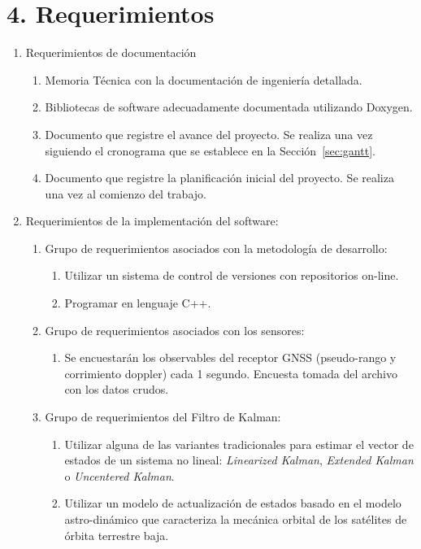 \documentclass[11pt]{charter}
\begin{document}
\section{4. Requerimientos}
\label{sec:requerimientos}

\begin{enumerate}
\item Requerimientos de documentación
	\begin{enumerate}
	\item Memoria Técnica con la documentación de ingeniería detallada.
	\item Bibliotecas de software adecuadamente documentada utilizando Doxygen.
	\item Documento que registre el avance del proyecto. Se realiza una vez siguiendo el cronograma que se establece en la Sección~\ref{sec:gantt}.
	\item Documento que registre la planificación inicial del proyecto. Se realiza una vez al comienzo del trabajo.
	\end{enumerate}
\item Requerimientos de la implementación del software:
	\begin{enumerate}
	\item Grupo de requerimientos asociados con la metodología de desarrollo:
		\begin{enumerate}
		\item Utilizar un sistema de control de versiones con repositorios on-line.
		\item Programar en lenguaje C++.
		\end{enumerate}
	\item Grupo de requerimientos asociados con los sensores:
		\begin{enumerate}
		\item Se encuestarán los observables del receptor GNSS (pseudo-rango y corrimiento doppler) cada 1 segundo. Encuesta tomada del archivo con los datos crudos.
		\end{enumerate}
	\item Grupo de requerimientos del Filtro de Kalman:
		\begin{enumerate}
		\item Utilizar alguna de las variantes tradicionales para estimar el vector de estados de un sistema no lineal: \textit{Linearized Kalman}, \textit{Extended Kalman} o \textit{Uncentered Kalman}.
		\item Utilizar un modelo de actualización de estados basado en el modelo astro-dinámico que caracteriza la mecánica orbital de los satélites de órbita terrestre baja.

\end{enumerate}
\end{enumerate}
\end{enumerate}
\end{document}
